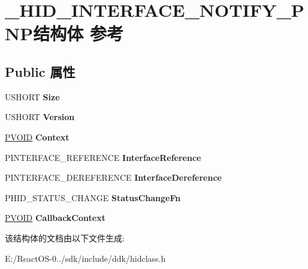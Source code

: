 \hypertarget{struct___h_i_d___i_n_t_e_r_f_a_c_e___n_o_t_i_f_y___p_n_p}{}\section{\+\_\+\+H\+I\+D\+\_\+\+I\+N\+T\+E\+R\+F\+A\+C\+E\+\_\+\+N\+O\+T\+I\+F\+Y\+\_\+\+P\+N\+P结构体 参考}
\label{struct___h_i_d___i_n_t_e_r_f_a_c_e___n_o_t_i_f_y___p_n_p}
\subsection*{Public 属性}
\begin{DoxyCompactItemize}
\item 
\mbox{\label{struct___h_i_d___i_n_t_e_r_f_a_c_e___n_o_t_i_f_y___p_n_p_a3280d03c09060c72f92febee1f562789}} 
U\+S\+H\+O\+RT {\bfseries Size}
\item 
\mbox{\label{struct___h_i_d___i_n_t_e_r_f_a_c_e___n_o_t_i_f_y___p_n_p_a54b0f638b12d0a3870e2c50e73fbdda5}} 
U\+S\+H\+O\+RT {\bfseries Version}
\item 
\mbox{\label{struct___h_i_d___i_n_t_e_r_f_a_c_e___n_o_t_i_f_y___p_n_p_a9c597cc2f956d3c8a871d829fd9ff8dc}} 
\hyperlink{interfacevoid}{P\+V\+O\+ID} {\bfseries Context}
\item 
\mbox{\label{struct___h_i_d___i_n_t_e_r_f_a_c_e___n_o_t_i_f_y___p_n_p_a3431dc1174085869e40e8da4c72f527f}} 
P\+I\+N\+T\+E\+R\+F\+A\+C\+E\+\_\+\+R\+E\+F\+E\+R\+E\+N\+CE {\bfseries Interface\+Reference}
\item 
\mbox{\label{struct___h_i_d___i_n_t_e_r_f_a_c_e___n_o_t_i_f_y___p_n_p_a75fde97adf18e8a8b3b11303edcc7364}} 
P\+I\+N\+T\+E\+R\+F\+A\+C\+E\+\_\+\+D\+E\+R\+E\+F\+E\+R\+E\+N\+CE {\bfseries Interface\+Dereference}
\item 
\mbox{\label{struct___h_i_d___i_n_t_e_r_f_a_c_e___n_o_t_i_f_y___p_n_p_aaddfd2795d0f6e1fe982c5d5068f70d5}} 
P\+H\+I\+D\+\_\+\+S\+T\+A\+T\+U\+S\+\_\+\+C\+H\+A\+N\+GE {\bfseries Status\+Change\+Fn}
\item 
\mbox{\label{struct___h_i_d___i_n_t_e_r_f_a_c_e___n_o_t_i_f_y___p_n_p_a8a7d70e85bc350748dbff1bae41212f5}} 
\hyperlink{interfacevoid}{P\+V\+O\+ID} {\bfseries Callback\+Context}
\end{DoxyCompactItemize}


该结构体的文档由以下文件生成\+:\begin{DoxyCompactItemize}
\item 
E\+:/\+React\+O\+S-\/0../sdk/include/ddk/hidclass.\+h\end{DoxyCompactItemize}
